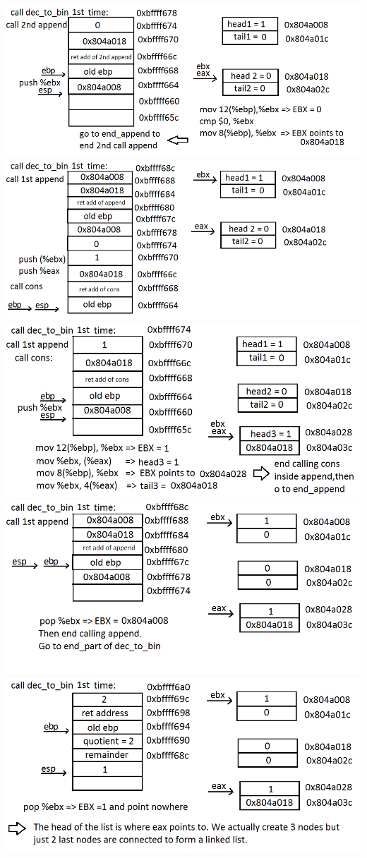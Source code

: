 \documentclass{article}
\begin{document}
\begin{center}
\includegraphics[scale=0.5]{stack16.png}\\
\includegraphics[scale=0.5]{stack17.png} \\
\includegraphics[scale=0.5]{stack18.png} \\
\includegraphics[scale=0.5]{stack19.png} \\
\includegraphics[scale=0.5]{stack20.png}
\end{center}
\end{document}
